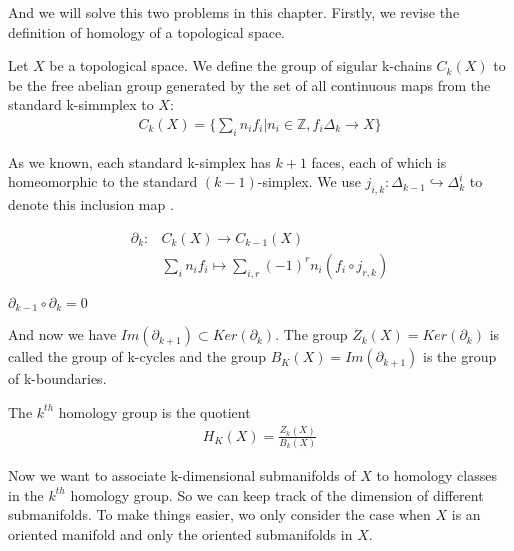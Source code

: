\documentclass{article}
\begin{document}
And we will solve this two problems in this chapter.  Firstly, we revise the definition
of homology of a topological space.
\begin{df}
    Let $X$ be a topological space. We define the group of sigular k-chains $C_{k}(X)$
    to be the free abelian group generated by the set of all continuous maps from
    the standard k-simmplex to $X$:
    \begin{align*}
        C_{k}(X)=  \{\sum_{i}n_{i}f_{i}|n_{i} \in \mathbb{Z}, f_{i}\Delta_{k} \rightarrow X\}
    \end{align*}
\end{df}
As we known, each standard k-simplex has $k+1$ faces, each of which is homeomorphic to the standard
$(k-1)$-simplex. We use $j_{i,k}: \Delta_{k-1} \hookrightarrow \Delta_{k}^{i}$ to denote this inclusion map
.

\begin{df}
    \begin{align*}
         \partial_{k} : & C_{k}(X) \rightarrow C_{k-1}(X) \\
      & \sum_{i}n_{i}f_{i} \mapsto  \sum_{i,r}(-1)^{r}n_{i}(f_{i}\circ j_{r,k})
    \end{align*}
        
\end{df}

\begin{lm}
   
    $\partial_{k-1}\circ \partial_{k}=0$
    
    
\end{lm}

And now we have $Im(\partial_{k+1}) \subset Ker(\partial_{k})$. The group
$Z_{k}(X) = Ker(\partial_{k})$ is called the group of k-cycles and the group
$B_{K}(X) = Im(\partial_{k+1})$ is the group of k-boundaries.

\begin{df}
    The $k^{th}$ homology group is the quotient
    \begin{align*}
        H_{K}(X) = \frac{Z_{k}(X)}{B_{k}(X)}
    \end{align*}
\end{df}


Now we want to associate k-dimensional submanifolds of $X$ to homology classes in the $k^{th}$
homology group. So we can keep track of the dimension of different submanifolds. To make things 
easier, wo only consider the case when $X$ is an oriented manifold and only the oriented submanifolds
in $X$.
\end{document}
